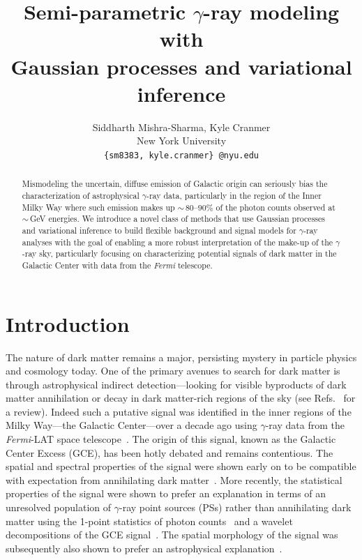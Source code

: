 \documentclass[]{article}
\title{Semi-parametric $\gamma$-ray modeling with \\ Gaussian processes and variational inference}
\author{%
  Siddharth Mishra-Sharma, Kyle Cranmer\\
  New York University \\
  \texttt{\{sm8383,\,kyle.cranmer\}\,@nyu.edu} \\
}
\begin{document}
\maketitle

\begin{abstract}
  Mismodeling the uncertain, diffuse emission of Galactic origin can seriously bias the characterization of astrophysical $\gamma$-ray data, particularly in the region of the Inner Milky Way where such emission makes up $\sim$\,$80$--$90\%$ of the photon counts observed at $\sim$\,GeV energies. We introduce a novel class of methods that use Gaussian processes and variational inference to build flexible background and signal models for $\gamma$-ray analyses with the goal of enabling a more robust interpretation of the make-up of the $\gamma$-ray sky, particularly focusing on characterizing potential signals of dark matter in the Galactic Center with data from the \emph{Fermi} telescope.
\end{abstract}

\section{Introduction}
\label{sec:intro}

The nature of dark matter remains a major, persisting mystery in particle physics and cosmology today. One of the primary avenues to search for dark matter is through astrophysical indirect detection---looking for visible byproducts of dark matter annihilation or decay in dark matter-rich regions of the sky (see Refs.~\cite{Slatyer:2017sev,Lisanti:2016jxe} for a review). Indeed such a putative signal was identified in the inner regions of the Milky Way---the Galactic Center---over a decade ago using $\gamma$-ray data from the \emph{Fermi}-LAT space telescope~\cite{Goodenough:2009gk}. The origin of this signal, known as the Galactic Center Excess (GCE), has been hotly debated and remains contentious. The spatial and spectral properties of the signal were shown early on to be compatible with expectation from annihilating dark matter~\cite{Hooper:2010mq,Daylan:2014rsa}. More recently, the statistical properties of the signal were shown to prefer an explanation in terms of an unresolved population of $\gamma$-ray point sources (PSs) rather than annihilating dark matter using the 1-point statistics of photon counts~\cite{Lee:2015fea} and a wavelet decompositions of the GCE signal~\cite{Bartels:2015aea}. The spatial morphology of the signal was subsequently also shown to prefer an astrophysical explanation~\cite{Macias:2016nev,Macias:2019omb,Bartels:2017vsx}.
\end{document}
